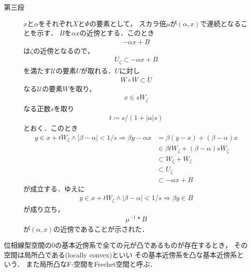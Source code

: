 \begin{sketch}
\begin{description}
			\item[第三段]
				$x$と$\alpha$をそれぞれ$X$と$\Phi$の要素として，
				スカラ倍$\mu$が$(\alpha,x)$で連続となることを示す．
				$B$を$\alpha x$の近傍とする．このとき
				\begin{align}
					-\alpha x + B
				\end{align}
				は$\zeta$の近傍となるので，
				\begin{align}
					U_\zeta \subset -\alpha x + B 
				\end{align}
				を満たす$\mathscr{U}$の要素$U$が取れる．$U$に対し
				\begin{align}
					W \circ W \subset U
				\end{align}
				なる$\mathscr{U}$の要素$W$を取り，
				\begin{align}
					x \in s W_\zeta
				\end{align}
				なる正数$s$を取り
				\begin{align}
					t \coloneqq s/(1+|\alpha|s)
				\end{align}
				とおく．このとき
				\begin{align}
					y \in x+t W_\zeta \wedge |\beta - \alpha| < 1/s
					\Longrightarrow \beta y - \alpha x
					&= \beta (y-x) + (\beta - \alpha)x \\
					&\in \beta t W_\zeta + (\beta - \alpha) s W_\zeta \\
					&\subset W_\zeta + W_\zeta \\
					&\subset U_\zeta \\
					&\subset -\alpha x + B
				\end{align}
				が成立する．ゆえに
				\begin{align}
					y \in x+t W_\zeta \wedge |\beta - \alpha| < 1/s
					\Longrightarrow \beta y \in B
				\end{align}
				が成り立ち，
				\begin{align}
					\mu^{-1} \ast B
				\end{align}
				が$(\alpha,x)$の近傍であることが示された．
				
		\end{description}
	\end{sketch}
	
	\begin{screen}
		\begin{dfn}
			位相線型空間の0の基本近傍系で全ての元が凸であるものが存在するとき，
			その空間は局所凸である(locally convex)といい
			その基本近傍系を凸な基本近傍系という．
			また局所凸なF-空間をFrechet空間と呼ぶ．
		\end{dfn}
	\end{screen}
	
